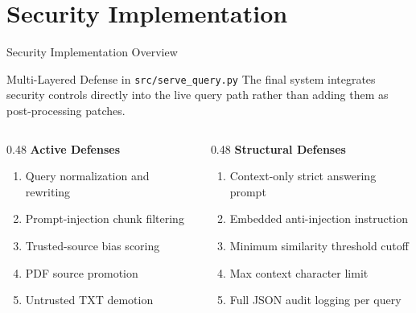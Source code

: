 \documentclass[aspectratio=169]{beamer}
\begin{document}
\section{Security Implementation}
\begin{frame}{Security Implementation Overview}
    \begin{block}{Multi-Layered Defense in \texttt{src/serve\_query.py}}
        The final system integrates security controls directly into the live query path rather than adding them as post-processing patches.
    \end{block}
    \vspace{0.2cm}
    \small
    \begin{columns}[t]
        \begin{column}{0.48\textwidth}
            \textbf{\textcolor{defensegreen}{Active Defenses}}
            \begin{enumerate}
                \item Query normalization and rewriting
                \item Prompt-injection chunk filtering
                \item Trusted-source bias scoring
                \item PDF source promotion
                \item Untrusted TXT demotion
            \end{enumerate}
        \end{column}
        \begin{column}{0.48\textwidth}
            \textbf{\textcolor{defensegreen}{Structural Defenses}}
            \begin{enumerate}
                \item Context-only strict answering prompt
                \item Embedded anti-injection instruction
                \item Minimum similarity threshold cutoff
                \item Max context character limit
                \item Full JSON audit logging per query
            \end{enumerate}
        \end{column}
    \end{columns}
\end{frame}
\end{document}
